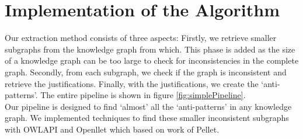 \documentclass[11pt,letterpaper ,oneside ]{book}
\begin{document}
	\section{Implementation of the Algorithm}
	Our extraction method consists of three aspects: Firstly, we retrieve smaller subgraphs from the knowledge graph from which. This phase is added as the size of a knowledge graph can be too large to check for inconsistencies in the complete graph. Secondly, from each subgraph, we check if the graph is inconsistent and retrieve the justifications. Finally, with the justifications, we create the `anti-patterns'. The entire pipeline is shown in figure \ref{fig:simplePipeline}.\\
	Our pipeline is designed to find `almost' all the `anti-patterns' in any knowledge graph. We implemented techniques to find these smaller inconsistent subgraphs with OWLAPI\cite{Horridge:2011} and Openllet\cite{Openllet:2019} which based on work of Pellet\cite{Pellet:2007}.\\
	
\end{document}
